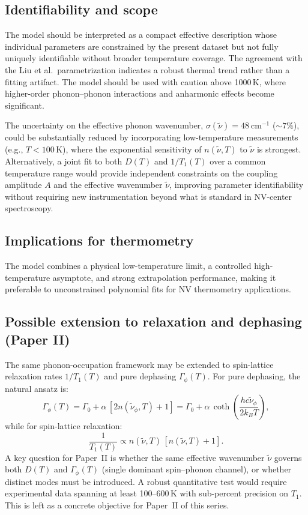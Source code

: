 \documentclass[12pt,a4paper]{article}
\begin{document}
\subsection{Identifiability and scope}

The model should be interpreted as a compact effective description whose
individual parameters are constrained by the present dataset but not
fully uniquely identifiable without broader temperature coverage.
The agreement with the Liu et al.\ parametrization indicates a robust
thermal trend rather than a fitting artifact.
The model should be used with caution above 1000\,K, where higher-order
phonon--phonon interactions and anharmonic effects become significant.

The uncertainty on the effective phonon wavenumber,
$\sigma(\tilde{\nu}) = 48\ \mathrm{cm}^{-1}$ (${\sim}7\%$),
could be substantially reduced by incorporating low-temperature
measurements (e.g., $T < 100$\,K), where the exponential sensitivity
of $n(\tilde{\nu}, T)$ to $\tilde{\nu}$ is strongest.
Alternatively, a joint fit to both $D(T)$ and $1/T_1(T)$ over a common
temperature range would provide independent constraints on the coupling
amplitude $A$ and the effective wavenumber $\tilde{\nu}$, improving
parameter identifiability without requiring new instrumentation beyond
what is standard in NV-center spectroscopy.

\subsection{Implications for thermometry}

The model combines a physical low-temperature limit, a controlled
high-temperature asymptote, and strong extrapolation performance,
making it preferable to unconstrained polynomial fits for NV
thermometry applications.

\subsection{Possible extension to relaxation and dephasing (Paper II)}

The same phonon-occupation framework may be extended to spin-lattice
relaxation rates $1/T_1(T)$ and pure dephasing $\Gamma_\phi(T)$.
For pure dephasing, the natural ansatz is:
%
\begin{equation}
    \Gamma_\phi(T) = \Gamma_0 + \alpha\,[2n(\tilde{\nu}_\phi, T)+1]
    = \Gamma_0 + \alpha\,\coth\!\left(\frac{hc\tilde{\nu}_\phi}{2k_BT}\right),
\end{equation}
%
while for spin-lattice relaxation:
%
\begin{equation}
    \frac{1}{T_1(T)} \propto n(\tilde{\nu},T)\,[n(\tilde{\nu},T)+1].
\end{equation}
%
A key question for Paper~II is whether the same effective wavenumber
$\tilde{\nu}$ governs both $D(T)$ and $\Gamma_\phi(T)$
(single dominant spin--phonon channel), or whether distinct modes must
be introduced.
A robust quantitative test would require experimental data spanning
at least 100--600\,K with sub-percent precision on $T_1$.
This is left as a concrete objective for Paper~II of this series.
\end{document}
